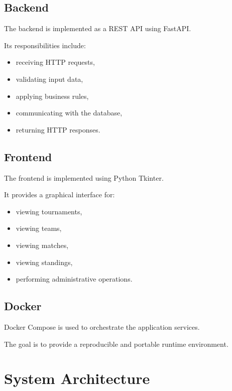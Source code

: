 \documentclass[12pt,a4paper]{article}
\begin{document}
\subsection{Backend}

The backend is implemented as a REST API using FastAPI.

Its responsibilities include:

\begin{itemize}
    \item receiving HTTP requests,
    \item validating input data,
    \item applying business rules,
    \item communicating with the database,
    \item returning HTTP responses.
\end{itemize}

\subsection{Frontend}

The frontend is implemented using Python Tkinter.

It provides a graphical interface for:

\begin{itemize}
    \item viewing tournaments,
    \item viewing teams,
    \item viewing matches,
    \item viewing standings,
    \item performing administrative operations.
\end{itemize}

\subsection{Docker}

Docker Compose is used to orchestrate the application services.

The goal is to provide a reproducible and portable runtime environment.


\section{System Architecture}
\end{document}
